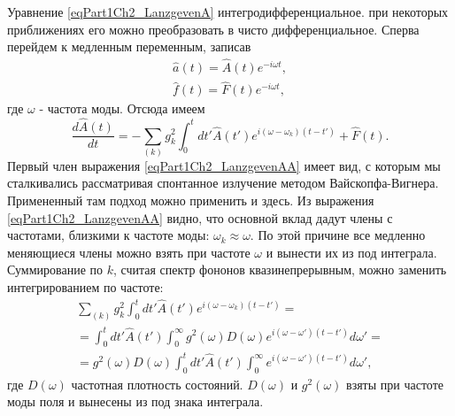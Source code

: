 Уравнение \eqref{eqPart1Ch2_LanzgevenA} интегродифференциальное. при
некоторых приближениях его можно преобразовать в чисто
дифференциальное. Сперва перейдем к медленным переменным, записав
\begin{eqnarray}
\hat{a}\left(t\right) = \hat{A}\left(t\right)e^{-i \omega t},
\nonumber \\
\hat{f}\left(t\right) = \hat{F}\left(t\right)e^{-i \omega t},
\nonumber
\end{eqnarray}
где $\omega$ - частота моды. Отсюда имеем
\begin{equation}
\frac{d \hat{A}\left(t\right)}{dt} = 
- \sum_{(k)} g_k^2 \int_0^t
d t'  \hat{A}\left(t'\right)e^{i \left(\omega -
  \omega_k\right)\left(t - t'\right)} 
+ \hat{F}\left(t\right).
\label{eqPart1Ch2_LanzgevenAA}
\end{equation}
Первый член выражения \eqref{eqPart1Ch2_LanzgevenAA} имеет вид, с которым мы
сталкивались рассматривая спонтанное излучение методом
Вайскопфа-Вигнера. Примененный там подход можно применить и здесь. Из
выражения \eqref{eqPart1Ch2_LanzgevenAA} видно, что основной вклад
дадут члены с частотами, близкими к частоте моды: $\omega_k \approx
\omega$. По этой причине все медленно меняющиеся члены можно взять при
частоте $\omega$ и вынести их из под интеграла. Суммирование по $k$,
считая спектр фононов квазинепрерывным, можно заменить интегрированием
по частоте:
\begin{eqnarray}
\sum_{(k)}g_k^2\int_0^t d t' \hat{A}\left(t'\right) e^{i\left(\omega -
  \omega_k\right)\left(t - t'\right)} = 
\nonumber \\
=
\int_0^t d t'
  \hat{A}\left(t'\right)\int_0^{\infty}g^2\left(\omega\right) 
D\left(\omega\right) e^{i\left(\omega -
  \omega'\right)\left(t - t'\right)} d \omega' = 
\nonumber \\
= g^2\left(\omega\right) 
D\left(\omega\right)
\int_0^t d t'
  \hat{A}\left(t'\right)
\int_0^{\infty}e^{i\left(\omega -
  \omega'\right)\left(t - t'\right)} d \omega',
\nonumber
\end{eqnarray}
где $D\left(\omega\right)$ частотная плотность состояний.
$D\left(\omega\right)$ и $g^2\left(\omega\right)$ взяты при частоте
моды поля и вынесены из под знака интеграла.

